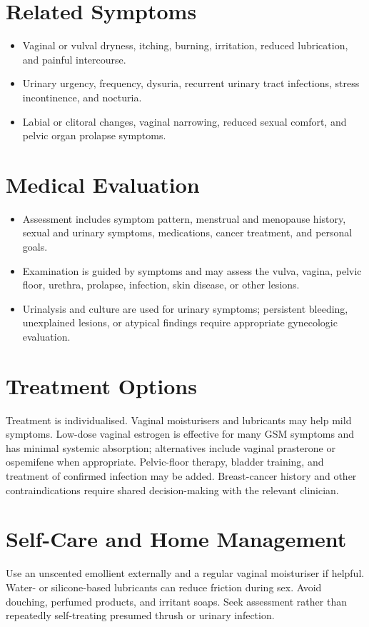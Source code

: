 \section*{Related Symptoms}
\begin{itemize}
  \item Vaginal or vulval dryness, itching, burning, irritation, reduced lubrication, and painful intercourse.
  \item Urinary urgency, frequency, dysuria, recurrent urinary tract infections, stress incontinence, and nocturia.
  \item Labial or clitoral changes, vaginal narrowing, reduced sexual comfort, and pelvic organ prolapse symptoms.
\end{itemize}

\section*{Medical Evaluation}
\begin{itemize}
  \item Assessment includes symptom pattern, menstrual and menopause history, sexual and urinary symptoms, medications, cancer treatment, and personal goals.
  \item Examination is guided by symptoms and may assess the vulva, vagina, pelvic floor, urethra, prolapse, infection, skin disease, or other lesions.
  \item Urinalysis and culture are used for urinary symptoms; persistent bleeding, unexplained lesions, or atypical findings require appropriate gynecologic evaluation.
\end{itemize}

\section*{Treatment Options}
Treatment is individualised. Vaginal moisturisers and lubricants may help mild symptoms. Low-dose vaginal estrogen is effective for many GSM symptoms and has minimal systemic absorption; alternatives include vaginal prasterone or ospemifene when appropriate. Pelvic-floor therapy, bladder training, and treatment of confirmed infection may be added. Breast-cancer history and other contraindications require shared decision-making with the relevant clinician.

\section*{Self-Care and Home Management}
Use an unscented emollient externally and a regular vaginal moisturiser if helpful. Water- or silicone-based lubricants can reduce friction during sex. Avoid douching, perfumed products, and irritant soaps. Seek assessment rather than repeatedly self-treating presumed thrush or urinary infection.

